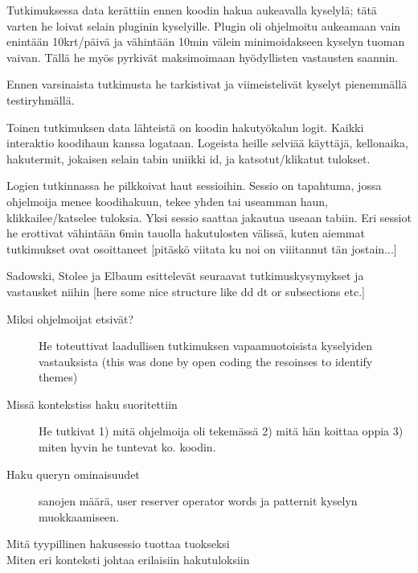 \documentclass[finnish]{../tktltiki2}
\theoremstyle{definition}
\theoremstyle{remark}
\begin{document}
Tutkimuksessa data kerättiin ennen koodin hakua aukeavalla kyselylä; tätä varten he loivat selain pluginin kyselyille. Plugin oli ohjelmoitu aukeamaan vain enintään 10krt/päivä ja vähintään 10min välein minimoidakseen kyselyn tuoman vaivan. Tällä he myös pyrkivät maksimoimaan hyödyllisten vastausten saannin.

Ennen varsinaista tutkimusta he tarkistivat ja viimeistelivät kyselyt pienemmällä testiryhmällä.

Toinen tutkimuksen data lähteistä on koodin hakutyökalun logit. Kaikki interaktio koodihaun kanssa logataan. Logeista heille selviää käyttäjä, kellonaika, hakutermit, jokaisen selain tabin uniikki id, ja katsotut/klikatut tulokset.

Logien tutkinnassa he pilkkoivat haut sessioihin. Sessio on tapahtuma, jossa ohjelmoija menee koodihakuun, tekee yhden tai useamman haun, klikkailee/katselee tuloksia. Yksi sessio saattaa jakautua useaan tabiin. Eri sessiot he erottivat vähintään 6min tauolla hakutulosten välissä, kuten aiemmat tutkimukset ovat osoittaneet [pitäskö viitata ku noi on viiitannut tän jostain...]



Sadowski, Stolee ja Elbaum esittelevät seuraavat tutkimuskysymykset ja vastausket niihin
[here some nice structure like dd dt or subsections etc.]

\begin{description}

  \item [Miksi ohjelmoijat etsivät?] He toteuttivat laadullisen tutkimuksen vapaamuotoisista kyselyiden vastauksista (this was done by open coding the resoinses to identify themes)

  \item [Missä kontekstiss haku suoritettiin] He tutkivat 1) mitä ohjelmoija oli tekemässä 2) mitä hän koittaa oppia 3) miten hyvin he tuntevat ko. koodin.

  \item [Haku queryn ominaisuudet] sanojen määrä, user reserver operator words ja patternit kyselyn muokkaamiseen.

  \item [Mitä tyypillinen hakusessio tuottaa tuokseksi]

  \item [Miten eri konteksti johtaa erilaisiin hakutuloksiin]

\end{description}
\end{document}

